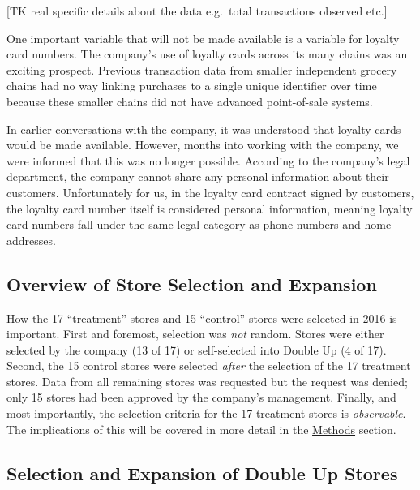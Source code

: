 \documentclass[12pt,letterpaperpaper,]{book}
\begin{document}
{[}TK real specific details about the data e.g.~total transactions
observed etc.{]}

One important variable that will not be made available is a variable for
loyalty card numbers. The company's use of loyalty cards across its many
chains was an exciting prospect. Previous transaction data from smaller
independent grocery chains had no way linking purchases to a single
unique identifier over time because these smaller chains did not have
advanced point-of-sale systems.

In earlier conversations with the company, it was understood that
loyalty cards would be made available. However, months into working with
the company, we were informed that this was no longer possible.
According to the company's legal department, the company cannot share
any personal information about their customers. Unfortunately for us, in
the loyalty card contract signed by customers, the loyalty card number
itself is considered personal information, meaning loyalty card numbers
fall under the same legal category as phone numbers and home addresses.

\subsection*{Overview of Store Selection and
Expansion}\label{overview-of-store-selection-and-expansion}

How the 17 ``treatment'' stores and 15 ``control'' stores were selected
in 2016 is important. First and foremost, selection was \emph{not}
random. Stores were either selected by the company (13 of 17) or
self-selected into Double Up (4 of 17). Second, the 15 control stores
were selected \emph{after} the selection of the 17 treatment stores.
Data from all remaining stores was requested but the request was denied;
only 15 stores had been approved by the company's management. Finally,
and most importantly, the selection criteria for the 17 treatment stores
is \emph{observable}. The implications of this will be covered in more
detail in the \protect\hyperlink{methods}{Methods} section.

\subsection*{Selection and Expansion of Double Up
Stores}\label{selection-and-expansion-of-double-up-stores}
\end{document}
